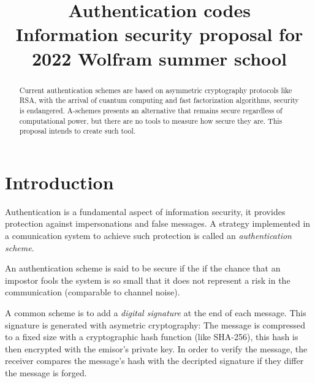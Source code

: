 \documentclass[conference]{IEEEtran}
\begin{document}
\title{
Authentication codes  \\
{\footnotesize Information security proposal for 2022 Wolfram summer school}
}

\author{
}

\maketitle

\begin{abstract}
    Current authentication schemes are based on asymmetric cryptography protocols like RSA, with the arrival of cuantum computing and fast factorization algorithms, security is endangered. A-schemes presents an alternative that remains secure regardless of computational power, but there are no tools to measure how secure they are. This proposal intends to create such tool.
\end{abstract}


%
%
\section{Introduction}
Authentication is a fundamental aspect of information security, it provides protection against impersonations and false messages. A strategy implemented in a comunication system to achieve such protection is called an \textit{authentication scheme}.

An authentication scheme is said to be secure if the if the chance that an impostor fools the system is so small that it does not represent a risk in the communication (comparable to channel noise).

A common scheme is to add a \textit{digital signature} at the end of each message. This signature is generated with asymetric cryptography: The message is compressed to a fixed size with a cryptographic hash function (like SHA-256), this hash is then encrypted with the emisor's private key. In order to verify the message, the receiver compares the message's hash with the decripted signature if they differ the message is forged.
\end{document}
